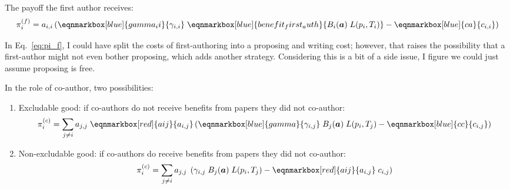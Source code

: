 \documentclass[12pt]{article}
\begin{document}
The payoff the first author receives:
\vspace{2em}
\begin{equation}
    \pi_i^{(f)} =  
    a_{i,i} \left( 
        \eqnmarkbox[blue]{gamma_ii}{\gamma_{i,i}} \; \eqnmarkbox[blue]{benefit_first_auth}{B_i(\boldsymbol{a}) \; L(p_i, T_i)}
        - \eqnmarkbox[blue]{ca}{c_{i,i}} 
    \right)
    \label{eq:pi_f}
\end{equation}

In Eq.~\ref{eq:pi_f},
I could have split the costs of first-authoring into a proposing and writing cost;
however, that raises the possibility that a first-author might not even bother proposing,
which adds another strategy.
Considering this is a bit of a side issue,
I figure we could just assume proposing is free.

In the role of co-author,
two possibilities:
\begin{enumerate}
    \item Excludable good: 
    if co-authors do not receive benefits from papers they did not co-author:
    \vspace{2em}
    \begin{equation}
        \pi_i^{(c)} = 
        \sum_{j \neq i} 
        a_{j,j} \; 
        \eqnmarkbox[red]{aij}{a_{i,j}} 
        \left( 
            \eqnmarkbox[blue]{gamma}{\gamma_{i,j}} \; B_j(\boldsymbol{a}) \; L(p_i, T_j)
            - \eqnmarkbox[blue]{cc}{c_{i,j}}
        \right)
        \label{eq:pi_c_1}
    \end{equation}

    \item Non-excludable good: 
    if co-authors do receive benefits from papers they did not co-author:
    \vspace{2em}
    \begin{equation}
        \pi_i^{(c)} = 
        \sum_{j \neq i} 
        a_{j,j} \; 
        \left( 
            \gamma_{i,j} \; B_j(\boldsymbol{a}) \; L(p_i, T_j)
            - 
            \eqnmarkbox[red]{aij}{a_{i,j}} \; c_{i,j}
        \right)
        \label{eq:pi_c_2}
    \end{equation}
\end{enumerate}
\end{document}
